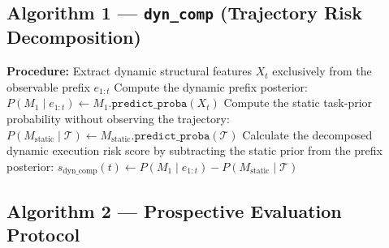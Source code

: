 \documentclass[12pt,a4paper]{article}
\begin{document}
\subsection{Algorithm 1 --- \texttt{dyn\_comp} (Trajectory Risk Decomposition)}

\begin{algorithm}[H]
\caption{\texttt{dyn\_comp} --- Trajectory Risk Decomposition}
\vspace{0.5em}
\textbf{Procedure:}
\BlankLine
Extract dynamic structural features $X_t$ exclusively from the observable prefix $e_{1:t}$\;
Compute the dynamic prefix posterior: $P(M_1 \mid e_{1:t}) \leftarrow M_1.\texttt{predict\_proba}(X_t)$\;
Compute the static task-prior probability without observing the trajectory: $P(M_{\mathrm{static}} \mid \mathcal{T}) \leftarrow M_{\mathrm{static}}.\texttt{predict\_proba}(\mathcal{T})$\;
Calculate the decomposed dynamic execution risk score by subtracting the static prior from the prefix posterior: $s_{\mathrm{dyn\_comp}}(t) \leftarrow P(M_1 \mid e_{1:t}) - P(M_{\mathrm{static}} \mid \mathcal{T})$\;
\;
\end{algorithm}

\subsection{Algorithm 2 --- Prospective Evaluation Protocol}
\end{document}

